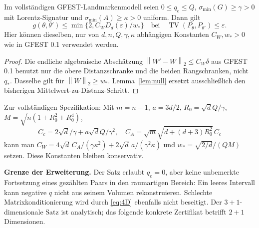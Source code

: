 \documentclass[11pt,a4paper]{article}
\newcommand{\TV}{\operatorname{TV}}\newcommand{\Pois}{\operatorname{Pois}}
\newcommand{\norm}[1]{\left\lVert#1\right\rVert}\newcommand{\abs}[1]{\left|#1\right|}
\newcommand{\smin}{\sigma_{\min}}\newcommand{\R}{\mathbb R}
\begin{document}
\begin{corollary}\label{cor:global}
Im vollständigen GFEST-Landmarkenmodell seien $0\leq q_e\leq Q$, $\smin(G)\geq\gamma>0$ mit Lorentz-Signatur und $\smin(A)\geq\kappa>0$ uniform. Dann gilt
\[
 g(\theta,\theta')\leq\min\{2,C_WD_d(\varepsilon)/w_*\}
 \quad\text{bei}\quad\TV(P_\theta,P_{\theta'})\leq\varepsilon.
\]
Hier können dieselben, nur von $d,n,Q,\gamma,\kappa$ abhängigen Konstanten $C_W,w_*>0$ wie in GFEST 0.1 verwendet werden.
\end{corollary}
\begin{proof}
Die endliche algebraische Abschätzung $\norm{W'-W}_2\leq C_W\delta$ aus GFEST 0.1 benutzt nur die obere Distanzschranke und die beiden Rangschranken, nicht $q_*$. Dasselbe gilt für $\norm{W}_2\geq w_*$. Lemma~\ref{lem:null} ersetzt ausschließlich den bisherigen Mittelwert-zu-Distanz-Schritt.
\end{proof}
Zur vollständigen Spezifikation: Mit $m=n-1$, $a=3d/2$, $R_0=\sqrt d Q/\gamma$, $M=\sqrt{n(1+R_0^2+R_0^4)}$,
\[
 C_c=2\sqrt d/\gamma+a\sqrt dQ/\gamma^2,\quad
 C_A=\sqrt m\sqrt{d+(d+3)R_0^2}\,C_c
\]
kann man $C_W=4\sqrt d\,C_A/(\gamma\kappa^2)+2\sqrt d\,a/(\gamma^2\kappa)$ und $w_*=\sqrt{2/d}/(QM)$ setzen. Diese Konstanten bleiben konservativ.

\textbf{Grenze der Erweiterung.} Der Satz erlaubt $q_e=0$, aber keine unbemerkte Fortsetzung eines gezählten Paars in den raumartigen Bereich: Ein leeres Intervall kann negative $q$ nicht aus seinem Volumen rekonstruieren. Schlechte Matrixkonditionierung wird durch \eqref{eq:4D} ebenfalls nicht beseitigt. Der $3+1$-dimensionale Satz ist analytisch; das folgende konkrete Zertifikat betrifft $2+1$ Dimensionen.
\end{document}
